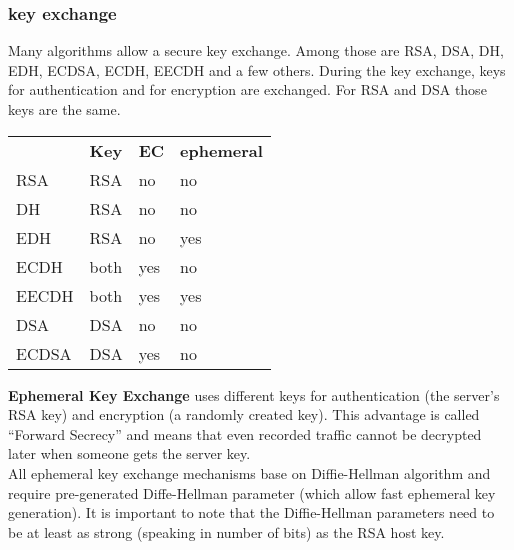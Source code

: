 
\subsubsection{key exchange}

Many algorithms allow a secure key exchange. Among those are RSA, DSA, DH, EDH, ECDSA,
ECDH, EECDH and a few others. During the key exchange, keys for authentication and for
encryption are exchanged. For RSA and DSA those keys are the same.

\begin{center}
\begin{tabular}{| l | l | l | l |}
    \toprule
 & \textbf{Key}  & \textbf{\cellcolor{orange}EC}  & \textbf{\cellcolor{green}ephemeral} \\ \cmidrule(lr){1-4}
    \cellcolor{red}    RSA   & RSA  & \cellcolor{green}no   & \cellcolor{red} no         \\
    \cellcolor{red}    DH    & RSA  & \cellcolor{green}no   & \cellcolor{red} no         \\
    \cellcolor{green}  EDH   & RSA  & \cellcolor{green}no   & \cellcolor{green} yes      \\
    \cellcolor{red}    ECDH  & both & \cellcolor{orange}yes & \cellcolor{red} no         \\
    \cellcolor{orange} EECDH & both & \cellcolor{orange}yes & \cellcolor{green} yes      \\
    \cellcolor{red}    DSA   & DSA  & \cellcolor{green}no   & \cellcolor{red} no         \\
    \cellcolor{red}    ECDSA & DSA  & \cellcolor{orange}yes & \cellcolor{red} no         \\
\bottomrule
\end{tabular}
\end{center}

\textbf{Ephemeral Key Exchange} uses different keys for authentication (the server's RSA
key) and encryption (a randomly created key). This advantage is called ``Forward
Secrecy'' and means that even recorded traffic cannot be decrypted later when someone
gets the server key. \\
All ephemeral key exchange mechanisms base on Diffie-Hellman algorithm and require
pre-generated Diffe-Hellman parameter (which allow fast ephemeral key generation). It
is important to note that the Diffie-Hellman parameters need to be at least as strong
(speaking in number of bits) as the RSA host key. 


